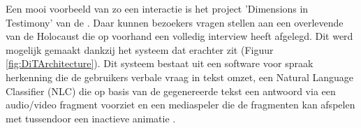 Een mooi voorbeeld van zo een interactie is het project 'Dimensions in Testimony' van de \textcite{USCShoahFoundation2020}. Daar kunnen bezoekers vragen stellen aan een overlevende van de Holocaust die op voorhand een volledig interview heeft afgelegd. Dit werd mogelijk gemaakt dankzij het systeem dat erachter zit (Figuur \ref{fig:DiTArchitecture}). Dit systeem bestaat uit een software voor spraak herkenning die de gebruikers verbale vraag in tekst omzet, een Natural Language Classifier (NLC) die op basis van de gegenereerde tekst een antwoord via een audio/video fragment voorziet en een mediaspeler die de fragmenten kan afspelen met tussendoor een inactieve animatie \autocite{Traum2015}.






%
%
%
%


